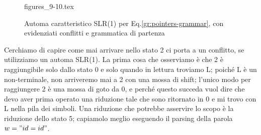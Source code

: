 \documentclass[class=book, crop=false, oneside, 12pt]{standalone}
\begin{document}


\begin{figure}[H]
    \centering
	{figures_9-10.tex}
    \caption{Automa caratteristico SLR(1) per Eq.\ref{gr:pointers-grammar}, con evidenziati conflitti e grammatica di partenza}
    \label{fig:pointers-automaton-slr1-conflict}
\end{figure}
Cerchiamo di capire come mai arrivare nello stato 2 ci porta a un conflitto, se utilizziamo un automa SLR(1). La prima cosa che osserviamo è che 2 è raggiungibile solo dallo stato 0 e solo quando in lettura troviamo L; poiché L è un non-terminale, non arriveremo mai a 2 con una mossa di shift; l'unico modo per  raggiungere 2 è una mossa di goto da 0, e perché questo succeda vuol dire che devo aver prima operato una riduzione tale che sono ritornato in 0 e mi trovo con L nella pila dei simboli. Una riduzione che potrebbe asservire lo scopo è la riduzione dello stato 5; capiamolo meglio eseguendo il parsing della parola \(w = "id=id"\).
\end{document}
